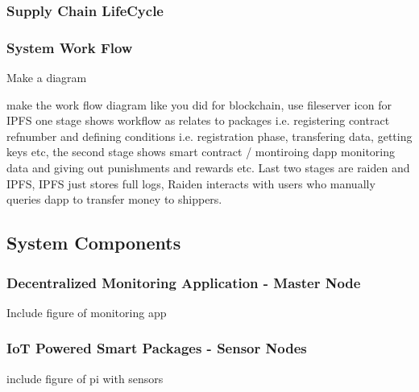 \subsubsection{Supply Chain LifeCycle}
\subsubsection{System Work Flow}
Make a diagram

make the work flow diagram like you did for blockchain, use fileserver icon for IPFS
one stage shows workflow as relates to packages i.e. registering contract refnumber and defining conditions i.e. registration phase, transfering data, getting keys etc, the second stage shows smart contract / montiroing dapp monitoring data and giving out punishments and rewards etc. Last two stages are raiden and IPFS, IPFS just stores full logs, Raiden interacts with users who manually queries dapp to transfer money to shippers.


\subsection{System Components}
\subsubsection{Decentralized Monitoring Application - Master Node}
Include figure of monitoring app
\subsubsection{IoT Powered Smart Packages - Sensor Nodes}
include figure of pi with sensors